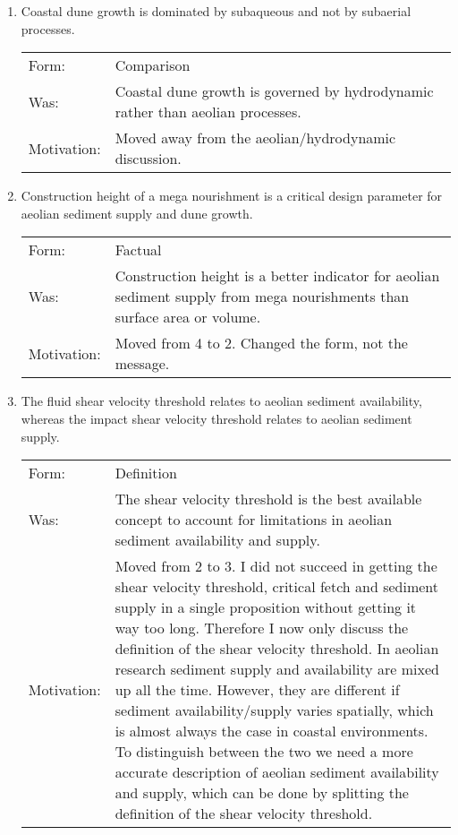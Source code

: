 \documentclass[headinclude,footinclude,cleardoublepage=empty,
numbers=noenddot,fontsize=9pt]{scrbook}
\begin{document}
\begin{enumerate}

\item Coastal dune growth is dominated by subaqueous and not by
  subaerial processes.

  \begin{tabular}{l p{8cm}}
    Form:       & Comparison \\
    Was:        & Coastal dune growth is governed by hydrodynamic rather than
                  aeolian processes. \\
    Motivation: & Moved away from the aeolian/hydrodynamic discussion. \\
  \end{tabular}

\item Construction height of a mega nourishment is a critical design
  parameter for aeolian sediment supply and dune growth.

  \begin{tabular}{l p{8cm}}
    Form:       & Factual \\
    Was:        & Construction height is a better indicator for aeolian
                  sediment supply from mega nourishments than surface area or
                  volume. \\
    Motivation: & Moved from 4 to 2. Changed the form, not the message. \\
  \end{tabular}

\item The fluid shear velocity threshold relates to aeolian sediment
  availability, whereas the impact shear velocity threshold relates
  to aeolian sediment supply.

  \begin{tabular}{l p{8cm}}
    Form:       & Definition \\
    Was:        & The shear velocity threshold is the best available
                  concept to account for limitations in aeolian sediment
                  availability and supply. \\
    Motivation: & Moved from 2 to 3. I did not succeed in getting the shear velocity
                  threshold, critical fetch and sediment supply in a single
                  proposition without getting it way too long. Therefore I now only
                  discuss the definition of the shear velocity threshold. In aeolian
                  research sediment supply and availability are mixed up all the
                  time. However, they are different if sediment availability/supply
                  varies spatially, which is almost always the case in coastal
                  environments. To distinguish between the two we need a more
                  accurate description of aeolian sediment availability and supply,
                  which can be done by splitting the definition of the shear
                  velocity threshold. \\
  \end{tabular}


\end{enumerate}
\end{document}
